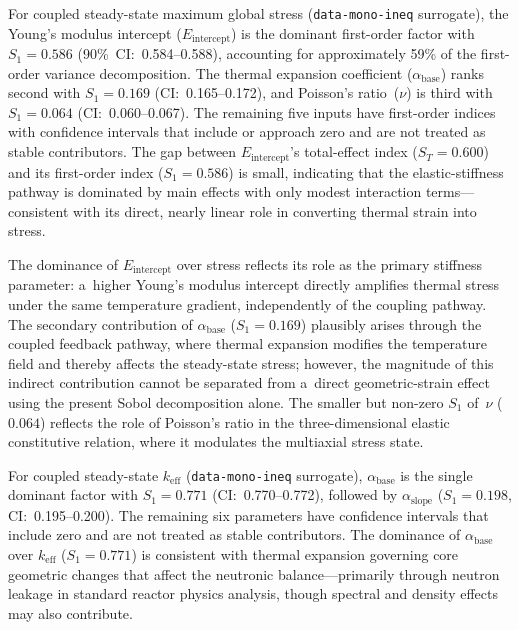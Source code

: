 \documentclass[pdflatex,sn-mathphys-num]{sn-jnl}
\theoremstyle{thmstyleone}
\theoremstyle{thmstyletwo}
\theoremstyle{thmstylethree}
\begin{document}
For coupled steady-state maximum global stress (\texttt{data-mono-ineq} surrogate),
the Young's modulus intercept ($E_{\mathrm{intercept}}$) is the dominant first-order
factor with $S_1 = 0.586$ (90\%~CI:~0.584--0.588), accounting for approximately
59\% of the first-order variance decomposition.
The thermal expansion coefficient ($\alpha_{\mathrm{base}}$) ranks second with
$S_1 = 0.169$ (CI:~0.165--0.172), and Poisson's ratio~($\nu$) is third with
$S_1 = 0.064$ (CI:~0.060--0.067).
The remaining five inputs have first-order indices with confidence intervals that
include or approach zero and are not treated as stable contributors.
The gap between $E_{\mathrm{intercept}}$'s total-effect index
($S_T = 0.600$) and its first-order index ($S_1 = 0.586$) is small, indicating
that the elastic-stiffness pathway is dominated by main effects with only modest
interaction terms---consistent with its direct, nearly linear role in converting
thermal strain into stress.

The dominance of $E_{\mathrm{intercept}}$ over stress reflects its role as the primary
stiffness parameter: a~higher Young's modulus intercept directly amplifies thermal
stress under the same temperature gradient, independently of the coupling pathway.
The secondary contribution of $\alpha_{\mathrm{base}}$ ($S_1 = 0.169$) plausibly
arises through the coupled feedback pathway, where thermal expansion modifies the
temperature field and thereby affects the steady-state stress; however, the
magnitude of this indirect contribution cannot be separated from a~direct
geometric-strain effect using the present Sobol decomposition alone.
The smaller but non-zero $S_1$ of~$\nu$ ($0.064$) reflects the role of Poisson's
ratio in the three-dimensional elastic constitutive relation, where it modulates
the multiaxial stress state.

For coupled steady-state $k_{\mathrm{eff}}$ (\texttt{data-mono-ineq} surrogate),
$\alpha_{\mathrm{base}}$ is the single dominant factor with $S_1 = 0.771$
(CI:~0.770--0.772), followed by $\alpha_{\mathrm{slope}}$ ($S_1 = 0.198$,
CI:~0.195--0.200).
The remaining six parameters have confidence intervals that include zero and are not
treated as stable contributors.
The dominance of $\alpha_{\mathrm{base}}$ over $k_{\mathrm{eff}}$ ($S_1 = 0.771$)
is consistent with thermal expansion governing core geometric changes that affect
the neutronic balance---primarily through neutron leakage in standard reactor
physics analysis, though spectral and density effects may also contribute.
\end{document}
